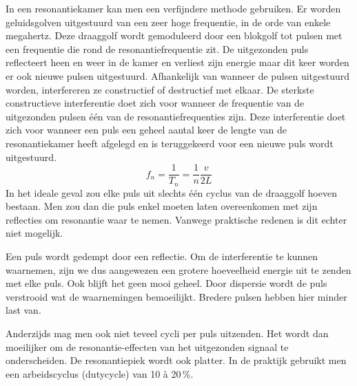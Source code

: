 In een resonantiekamer kan men een verfijndere methode gebruiken. Er worden 
geluidsgolven uitgestuurd van een zeer hoge frequentie, in de orde van enkele 
megahertz. Deze draaggolf wordt gemoduleerd door een blokgolf tot pulsen met 
een frequentie die rond de resonantiefrequentie zit. De uitgezonden puls 
reflecteert heen en weer in de kamer en verliest zijn energie maar dit keer 
worden er ook nieuwe pulsen uitgestuurd. Afhankelijk van wanneer de pulsen 
uitgestuurd worden, interfereren ze constructief of destructief met elkaar. De 
sterkste constructieve interferentie doet zich voor wanneer de frequentie van 
de uitgezonden pulsen \'e\'en van de resonantiefrequenties zijn. Deze 
interferentie doet zich voor wanneer een puls een geheel aantal keer de lengte 
van de resonantiekamer heeft afgelegd en is teruggekeerd voor een nieuwe puls 
wordt uitgestuurd.
\begin{equation}
\label{resfreq}
f_n = \frac{1}{T_n} = \frac{1}{n} \frac{v}{2L}
\end{equation}
In het ideale geval zou elke puls uit slechts \'e\'en cyclus van de draaggolf 
hoeven bestaan. Men zou dan die puls enkel moeten laten overeenkomen met zijn 
reflecties om resonantie waar te nemen. Vanwege praktische redenen is dit 
echter niet mogelijk.

Een puls wordt gedempt door een reflectie. Om de interferentie te kunnen 
waarnemen, zijn we dus aangewezen een grotere hoeveelheid energie uit te zenden 
met elke puls. Ook blijft het geen mooi geheel. Door dispersie wordt de puls 
verstrooid wat de waarnemingen bemoeilijkt. Bredere pulsen hebben hier minder 
last van.


Anderzijds mag men ook niet teveel cycli per puls uitzenden. Het wordt dan 
moeilijker om de resonantie-effecten van het uitgezonden signaal te 
onderscheiden. De resonantiepiek wordt ook platter. In de praktijk gebruikt men 
een arbeidscyclus (dutycycle) van 10 \`a 20\,\%.




